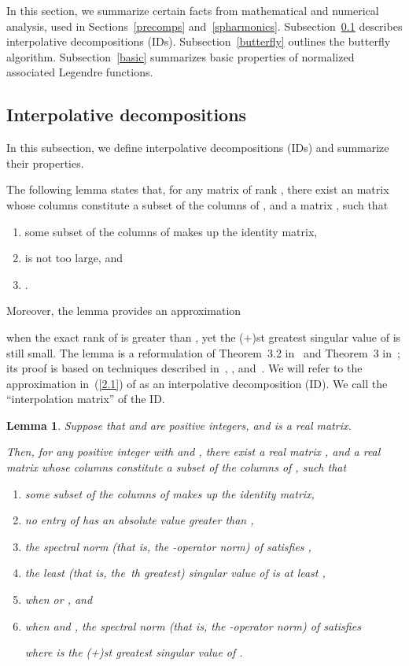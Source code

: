 \documentclass[final,3p,times]{elsarticle}
\newtheorem{lemma1}[theorem]{Lemma}
\newenvironment{lemma}{\begin{lemma1}}{\end{lemma1}}
\begin{document}
In this section, we summarize certain facts from mathematical
and numerical analysis, used in Sections~\ref{precomps} and~\ref{spharmonics}.
Subsection~\ref{ID_subsection} describes interpolative decompositions (IDs).
Subsection~\ref{butterfly} outlines the butterfly algorithm.
Subsection~\ref{basic} summarizes basic properties of normalized
associated Legendre functions.


\subsection{Interpolative decompositions}
\label{ID_subsection}

In this subsection, we define interpolative decompositions (IDs)
and summarize their properties.

The following lemma states that, for any  matrix 
of rank , there exist an  matrix 
whose columns constitute a subset of the columns of ,
and a  matrix , such that
\begin{enumerate}
\item some subset of the columns of  makes up
the  identity matrix,
\item  is not too large, and
\item .
\end{enumerate}
Moreover, the lemma provides an approximation 

when the exact rank of  is greater than ,
yet the (+)st greatest singular value of  is still small.
The lemma is a reformulation
of Theorem~3.2 in~\cite{martinsson-rokhlin-tygert1}
and Theorem~3 in~\cite{cheng-gimbutas-martinsson-rokhlin};
its proof is based on techniques described
in~\cite{goreinov-tyrtyshnikov}, \cite{gu-eisenstat96}, 
and~\cite{tyrtyshnikov}.
We will refer to the approximation in~(\ref{2.1}) of 
as an interpolative decomposition (ID).
We call  the ``interpolation matrix'' of the ID.

\begin{lemma}
\label{interpolation_lemma}
Suppose that  and  are positive integers,
and  is a real  matrix.

Then, for any positive integer  with  and ,
there exist a real  matrix ,
and a real  matrix  whose columns constitute a subset
of the columns of ,
such that
\begin{enumerate}
\item some subset of the columns of  makes up
the  identity matrix,
\item no entry of  has an absolute value greater than ,
\item the spectral norm (that is, the -operator norm) of 
satisfies
,
\item the least (that is, the \/\,th greatest) singular value
of  is at least ,
\item 
when  or , and
\item when  and , the spectral norm
(that is, the -operator norm)
of 
satisfies

where  is the (+)st greatest singular value of .
\end{enumerate}
\end{lemma}
\end{document}
